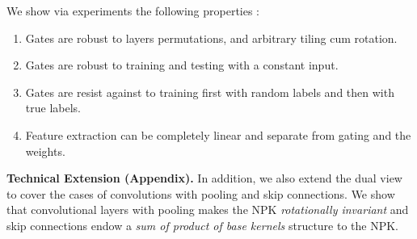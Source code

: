 We show via experiments the following properties :
\begin{enumerate}
\item Gates are robust to layers permutations, and arbitrary tiling cum rotation.
\item Gates are robust to  training and testing with a constant input. 
\item Gates are resist against to training first with random labels and then with true labels. 
\item Feature extraction can be completely linear and separate from gating and the weights.
\end{enumerate}
\textbf{Technical Extension (Appendix).} In addition, we also extend the dual view to cover the cases of convolutions with pooling and skip connections. We show that convolutional layers with pooling makes the NPK \emph{rotationally invariant} and skip connections endow a \emph{sum of product of base kernels} structure to the NPK.
\begin{comment}

CNN, Resnet to say that the framework can be extended successfully.

Perhaps the second important and powerful insights lie in the experimental implication contribution

why do we even care for a specific theory?

All through we differentiate from \cite{npk}
\end{comment}